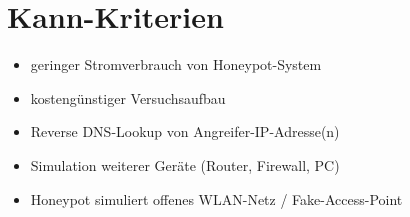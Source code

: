 \section{Kann-Kriterien}
\label{sec:Kann-Kriterien}
\begin{itemize}
\item geringer Stromverbrauch von Honeypot-System
\item kostengünstiger Versuchsaufbau
\item Reverse DNS-Lookup von Angreifer-IP-Adresse(n)
\item Simulation weiterer Geräte (Router, Firewall, PC)
\item Honeypot simuliert offenes WLAN-Netz / Fake-Access-Point
\end{itemize}


